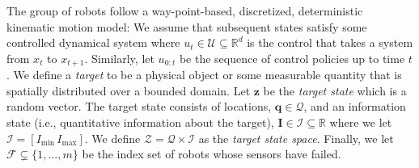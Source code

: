 \documentclass[letterpaper, 10 pt, conference]{ieeeconf}
\newcommand{\Ram}[1]{{\normalsize{\textbf{({\color{green}Ram:\ }#1)}}}}
\begin{document}
The group of robots follow a way-point-based, discretized, deterministic kinematic
motion model:
%
%
We assume that subsequent states satisfy some controlled dynamical system where $u_t \in \mathcal{U} \subseteq \mathbb{R}^d$ is the control that takes a system from $x_t$ to $x_{t+1}$.
Similarly, let $u_{0:t}$ be the sequence of control policies up to time $t$.
We define a \emph{target} to be a physical object or some measurable quantity that is spatially distributed over a bounded domain.
Let $\bm{z}$ be the \emph{target state} which is a random vector. 
The target state consists of locations, $\bm{q} \in \mathcal{Q}$, and an information state (i.e., quantitative information about the target), $\bm{I} \in \mathcal{I} \subseteq \mathbb{R}$ where we let $\mathcal{I} =[I_{\min}\,I_{\max}]$.
We define $\mathcal{Z} = \mathcal{Q} \times \mathcal{I}$ as the \emph{target state space}.
Finally, we let $\mathcal{F} \subsetneq \lbrace 1,\dots,m \rbrace$ be the index set of robots whose sensors have failed.
\end{document}
